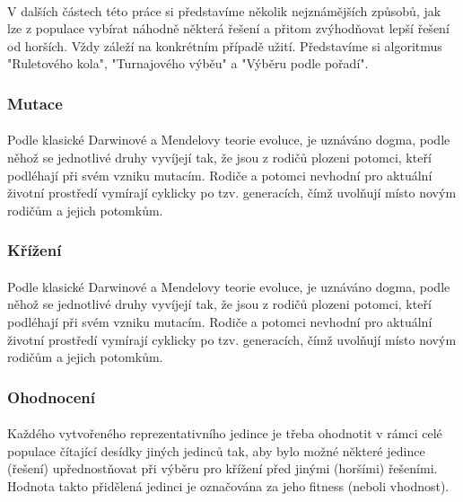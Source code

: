 \documentclass[bc,male,java,dept460]{diploma}		%
\begin{document}
\paragraph*{}
V dalších částech této práce si představíme několik nejznámějších způsobů, jak lze z populace vybírat náhodně některá řešení a přitom zvýhodňovat lepší řešení od horších. Vždy záleží na konkrétním případě užití. Představíme si algoritmus "Ruletového kola", "Turnajového výběu" a "Výběru podle pořadí".

\subsubsection{Mutace}
\paragraph*{}
Podle klasické Darwinové a Mendelovy teorie evoluce, je uznáváno dogma, podle něhož se jednotlivé druhy vyvíjejí tak, že jsou z rodičů plozeni potomci, kteří podléhají při svém vzniku mutacím. Rodiče a potomci nevhodní pro aktuální životní prostředí vymírají cyklicky po tzv. generacích, čímž uvolňují místo novým rodičům a jejich potomkům.

\subsubsection{Křížení}
\paragraph*{}
Podle klasické Darwinové a Mendelovy teorie evoluce, je uznáváno dogma, podle něhož se jednotlivé druhy vyvíjejí tak, že jsou z rodičů plozeni potomci, kteří podléhají při svém vzniku mutacím. Rodiče a potomci nevhodní pro aktuální životní prostředí vymírají cyklicky po tzv. generacích, čímž uvolňují místo novým rodičům a jejich potomkům.

\subsubsection{Ohodnocení}
\paragraph*{}
Každého vytvořeného reprezentativního jedince je třeba ohodnotit v rámci celé populace čítající desídky jiných jedinců tak, aby bylo možné některé jedince (řešení) upřednostňovat při výběru pro křížení před jinými (horšími) řešeními.
Hodnota takto přidělená jedinci je označována za jeho fitness (neboli vhodnost).
\end{document}
